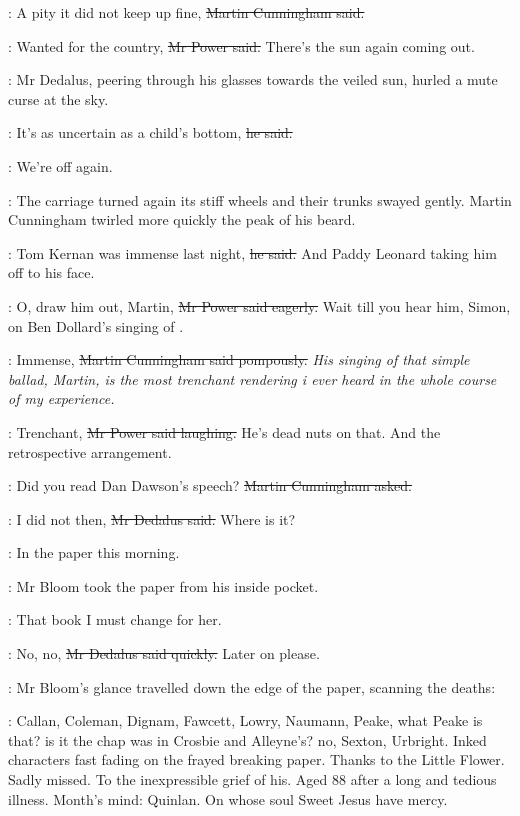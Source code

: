 \cunningham:
A pity it did not keep up fine,
\sout{Martin Cunningham said.}

\power:
Wanted for the country,
\sout{Mr Power said.}
There's the sun again coming out.

:
Mr Dedalus, peering through his glasses towards the veiled sun,
hurled a mute curse at the sky.

\simon:
It's as uncertain as a child's bottom,
\sout{he said.}

\cunningham:
We're off again.

:
The carriage turned again its stiff wheels
and their trunks swayed gently.
Martin Cunningham twirled more quickly the peak of his beard.

\cunningham:
Tom Kernan was immense last night,
\sout{he said.}
And Paddy Leonard taking him off to his face.

\power:
O, draw him out, Martin,
\sout{Mr Power said eagerly.}
Wait till you hear him, Simon,
on Ben Dollard's singing of .

\cunningham:
Immense,
\sout{Martin Cunningham said pompously.}
\emph{His singing of that simple ballad, Martin,
is the most trenchant rendering i ever heard in the whole course of my experience.}

\power:
Trenchant,
\sout{Mr Power said laughing.}
He's dead nuts on that.
And the retrospective arrangement.

\cunningham:
Did you read Dan Dawson's speech?
\sout{Martin Cunningham asked.}

\simon:
I did not then,
\sout{Mr Dedalus said.}
Where is it?

\cunningham:
In the paper this morning.

:
Mr Bloom took the paper from his inside pocket.

\BloomInt:
That book I must change for her.

\simon:
No, no,
\sout{Mr Dedalus said quickly.}
Later on please.

:
Mr Bloom's glance travelled down the edge of the paper,
scanning the deaths:

\BloomInt:
Callan, Coleman, Dignam, Fawcett, Lowry, Naumann,
Peake, what Peake is that?
is it the chap was in Crosbie and Alleyne's?
no, Sexton, Urbright.
Inked characters fast fading on the frayed breaking paper.
Thanks to the Little Flower.
Sadly missed.
To the inexpressible grief of his.
Aged 88 after a long and tedious illness.
Month's mind:
Quinlan.
On whose soul Sweet Jesus have mercy.

